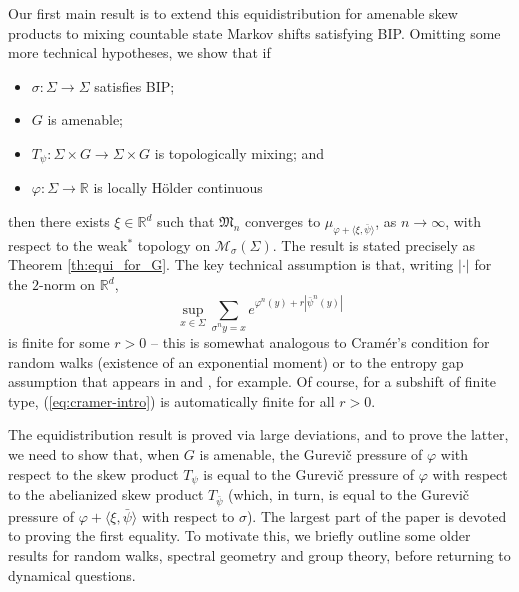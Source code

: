 \documentclass[11pt,letterpaper]{amsart}
\theoremstyle{definition}
\numberwithin{equation}{section}
\numberwithin{theorem}{section}
\def\R{\mathbb{R}}
\def\vp{\varphi}
\def\R{\mathbb R}
\begin{document}
Our first main result is to extend this equidistribution for amenable skew products to mixing countable state Markov shifts 
satisfying BIP. Omitting some more technical hypotheses, we show that if
\begin{itemize}
\item
$\sigma : \Sigma \to \Sigma$ satisfies BIP;
\item
$G$ is amenable;
\item
$T_\psi : \Sigma \times G \to \Sigma \times G$ is topologically mixing; and
\item
$\vp : \Sigma \to \R$ is locally H\"older continuous
\end{itemize}
then there exists $\xi \in \R^d$ such that
$\mathfrak M_n$ converges to 
$\mu_{\vp + \langle \xi,\bar \psi \rangle}$, as $n \to \infty$,
with respect to the weak$^*$ topology on $\mathcal M_\sigma(\Sigma)$.
The result is stated precisely as Theorem \ref{th:equi_for_G}.
The key technical assumption is that, writing $|\cdot|$ for the $2$-norm on $\R^d$,
\begin{equation}\label{eq:cramer-intro}
\sup_{x \in \Sigma} \sum_{\sigma^n y = x} e^{\vp^n(y) + r|\bar \psi^n(y)|}
\end{equation}
is finite for some $r>0$ -- this is somewhat analogous to Cram\'er's condition for random walks
(existence of an exponential moment) or to the entropy gap assumption
that appears in \cite{BCKM} and \cite{KM}, for example.
Of course, for a subshift of finite type, (\ref{eq:cramer-intro}) is automatically finite for all $r>0$.



The equidistribution result is proved via large deviations, and to prove the latter, we need to show that,
when $G$ is amenable, the Gurevi\v{c} pressure 
of $\vp$ with respect to the skew product $T_\psi$ is equal to the Gurevi\v{c} pressure 
of $\vp$ with respect to the abelianized skew product $T_{\bar \psi}$ (which, in turn, is equal to
the Gurevi\v{c} pressure of $\vp + \langle \xi,\bar \psi \rangle$ with respect to $\sigma$).
The largest part of the paper is devoted to proving the first equality.
 To motivate this, we briefly outline
some older results for random walks, spectral geometry and group theory, before returning to 
dynamical questions.
\end{document}
